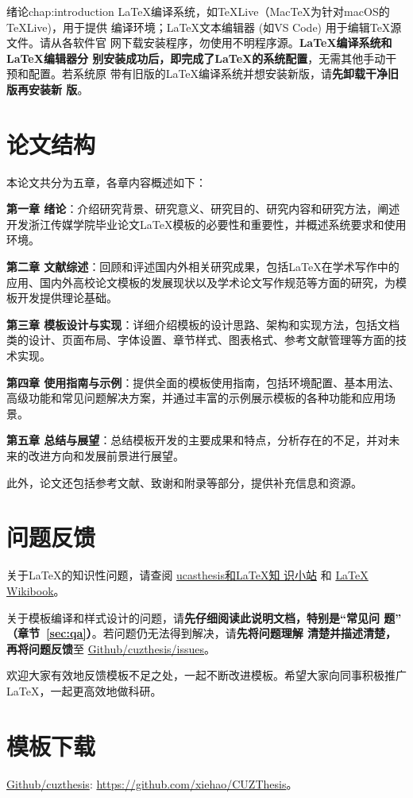 \begin{cuzchapter}{绪论}{chap:introduction}
	\LaTeX{}编译系统，如\TeX{}Live（Mac\TeX{}为针对macOS的\TeX{}Live)，用于提供
	编译环境；\LaTeX{}文本编辑器 (如VS Code) 用于编辑\TeX{}源文件。请从各软件官
	网下载安装程序，勿使用不明程序源。\textbf{\LaTeX{}编译系统和\LaTeX{}编辑器分
	别安装成功后，即完成了\LaTeX{}的系统配置}，无需其他手动干预和配置。若系统原
	带有旧版的\LaTeX{}编译系统并想安装新版，请\textbf{先卸载干净旧版再安装新
	版}。

	\section{论文结构}\label{sec:structure}

	本论文共分为五章，各章内容概述如下：

	\textbf{第一章 绪论}：介绍研究背景、研究意义、研究目的、研究内容和研究方法，阐述开发浙江传媒学院毕业论文\LaTeX{}模板的必要性和重要性，并概述系统要求和使用环境。

	\textbf{第二章 文献综述}：回顾和评述国内外相关研究成果，包括\LaTeX{}在学术写作中的应用、国内外高校论文模板的发展现状以及学术论文写作规范等方面的研究，为模板开发提供理论基础。

	\textbf{第三章 模板设计与实现}：详细介绍模板的设计思路、架构和实现方法，包括文档类的设计、页面布局、字体设置、章节样式、图表格式、参考文献管理等方面的技术实现。

	\textbf{第四章 使用指南与示例}：提供全面的模板使用指南，包括环境配置、基本用法、高级功能和常见问题解决方案，并通过丰富的示例展示模板的各种功能和应用场景。

	\textbf{第五章 总结与展望}：总结模板开发的主要成果和特点，分析存在的不足，并对未来的改进方向和发展前景进行展望。

	此外，论文还包括参考文献、致谢和附录等部分，提供补充信息和资源。



	\section{问题反馈}\label{sec:callback}

	关于\LaTeX{}的知识性问题，请查阅
	\href{https://github.com/mohuangrui/ucasthesis/wiki}{ucasthesis和\LaTeX{}知
	识小站} 和 \href{https://en.wikibooks.org/wiki/LaTeX}{\LaTeX{} Wikibook}。

	关于模板编译和样式设计的问题，请\textbf{先仔细阅读此说明文档，特别是“常见问
		题” （章节~\ref{sec:qa}）}。若问题仍无法得到解决，请\textbf{先将问题理解
		清楚并描述清楚，再将问题反馈}至
		\href{https://github.com/xiehao/CUZThesis/issues}{Github/cuzthesis/issues}。

	欢迎大家有效地反馈模板不足之处，一起不断改进模板。希望大家向同事积极推广
	\LaTeX{}，一起更高效地做科研。

	\section{模板下载}\label{sec:download}

	\begin{center}
		\href{https://github.com/xiehao/CUZThesis}{Github/cuzthesis}:
		\url{https://github.com/xiehao/CUZThesis}。
	\end{center}

\end{cuzchapter}